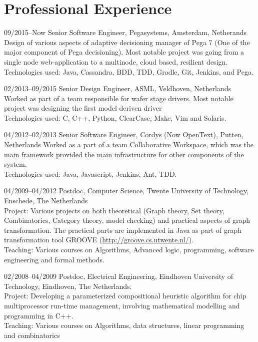 \section{Professional Experience}

\begin{CV}
\item[09/2015--Now] Senior Software Engineer, Pegasystems, Amsterdam, Netherands
Design of various aspects of adaptive decisioning manager of Pega 7 (One of the major component of Pega decisioning). Most notable project was going from a single node web-application to a multinode, cloud based, resilient design. \\
Technologies used: Java, Cassandra, BDD, TDD, Gradle, Git, Jenkins, and Pega.

\item[02/2013--09/2015] Senior Design Engineer, ASML, Veldhoven, Netherlands
Worked as part of a team responsible for wafer stage drivers. Most notable project was designing the first model deriven driver \\
Technologies used: C, C++, Python, ClearCase, Make, Vim and Solaris.

\item[04/2012--02/2013] Senior Software Engineer, Cordys (Now OpenText), Putten, Netherlands
Worked as a part of a team Collaborative Workspace, which was the main framework provided the main infrastructure for other components of the system. \\
Technologies used: Java, Javascript, Jenkins, Ant, TDD.

\item[04/2009--04/2012]Postdoc, Computer Science, Twente University of
Technology, Enschede, The Netherlands \\
\ifindustry
Project: Various projects on both theoretical (Graph theory, Set theory, Combinatorics, Category theory, model checking) and practical aspects of graph transformation. The practical
parts are implemented in Java as part of graph transformation tool GROOVE (\url{http://groove.cs.utwente.nl/}).  \\
Teaching: Various courses on Algorithms, Advanced logic, programming, software engineering and formal methods.
\fi

\item[02/2008--04/2009] Postdoc, Electrical Engineering, Eindhoven University
of Technology, Eindhoven, The Netherlands. \\
\ifindustry
Project: Developing a parameterized compositional heuristic algorithm for chip multiprocessor run-time management, involving mathematical modelling and programming in C++.\\
Teaching: Various courses on Algorithms, data structures, linear programming and combinatorics
\fi


\end{CV}

